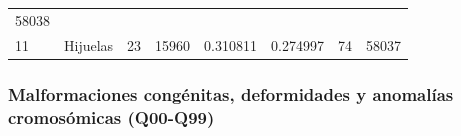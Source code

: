 \documentclass[]{article}
\begin{document}
\begin{longtable}[]{@{}llllllll@{}}
\begin{minipage}[t]{0.10\columnwidth}
58038\strut
\end{minipage}\tabularnewline
\begin{minipage}[t]{0.03\columnwidth}\raggedright
11\strut
\end{minipage} & \begin{minipage}[t]{0.09\columnwidth}\raggedright
Hijuelas\strut
\end{minipage} & \begin{minipage}[t]{0.14\columnwidth}\raggedright
23\strut
\end{minipage} & \begin{minipage}[t]{0.13\columnwidth}\raggedright
15960\strut
\end{minipage} & \begin{minipage}[t]{0.10\columnwidth}\raggedright
0.310811\strut
\end{minipage} & \begin{minipage}[t]{0.09\columnwidth}\raggedright
0.274997\strut
\end{minipage} & \begin{minipage}[t]{0.11\columnwidth}\raggedright
74\strut
\end{minipage} & \begin{minipage}[t]{0.10\columnwidth}\raggedright
58037\strut
\end{minipage}\tabularnewline
\bottomrule
\end{longtable}

\hypertarget{malformaciones-conguxe9nitas-deformidades-y-anomaluxedas-cromosuxf3micas-q00-q99}{%
\subsubsection{Malformaciones congénitas, deformidades y anomalías
cromosómicas
(Q00-Q99)}\label{malformaciones-conguxe9nitas-deformidades-y-anomaluxedas-cromosuxf3micas-q00-q99}}
\end{document}
